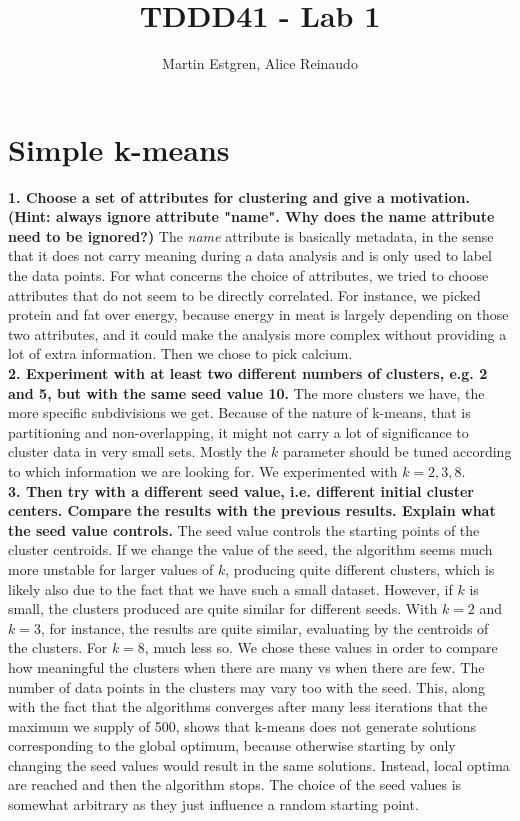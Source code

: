 \documentclass[]{article}
\title{TDDD41 - Lab 1}
\author{Martin Estgren, Alice Reinaudo}
\begin{document}
\maketitle

\section{Simple k-means}

\textbf{1. Choose a set of attributes for clustering and give a motivation. (Hint: always ignore attribute "name". Why does the name attribute need to be ignored?)}
The \textit{name} attribute is basically metadata, in the sense that it does not carry meaning during a data analysis and is only used to label the data points. For what concerns the choice of attributes, we tried to choose attributes that do not seem to be directly correlated. For instance, we picked protein and fat over energy, because energy in meat is largely depending on those two attributes, and it could make the analysis more complex without providing a lot of extra information. Then we chose to pick calcium.\\

\noindent\textbf{2. Experiment with at least two different numbers of clusters, e.g. 2 and 5, but with the same seed value 10.}
The more clusters we have, the more specific subdivisions we get. Because of the nature of k-means, that is partitioning and non-overlapping, it might not carry a lot of significance to cluster data in very small sets. Mostly the $k$ parameter should be tuned according to which information we are looking for. We experimented with $k=2,3,8$.\\

\noindent\textbf{3. Then try with a different seed value, i.e. different initial cluster centers. Compare the results with the previous results. Explain what the seed value controls.}
The seed value controls the starting points of the cluster centroids. If we change the value of the seed, the algorithm seems much more unstable for larger values of $k$, producing quite different clusters, which is likely also due to the fact that we have such a small dataset. However, if $k$ is small, the clusters produced are quite similar for different seeds. With $k=2$ and $k=3$, for instance, the results are quite similar, evaluating by the centroids of the clusters. For $k=8$, much less so. We chose these values in order to compare how meaningful the clusters when there are many vs when there are few. The number of data points in the clusters may vary too with the seed. This, along with the fact that the algorithms converges after many less iterations that the maximum we supply of 500, shows that k-means does not generate solutions corresponding to the global optimum, because otherwise starting by only changing the seed values would result in the same solutions. Instead, local optima are reached and then the algorithm stops. The choice of the seed values is somewhat arbitrary as they just influence a random starting point.\\
\end{document}
